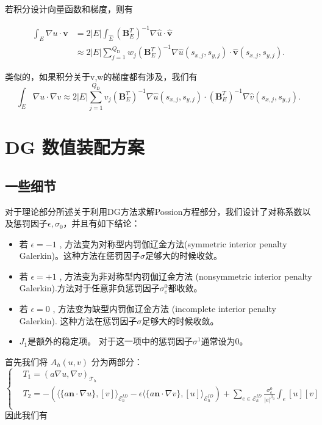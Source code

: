 若积分设计向量函数和梯度，则有

$$\begin{aligned}
\int_{E} \nabla u \cdot \boldsymbol{v} & =2|E| \int_{\hat{E}}\left(\boldsymbol{B}_{E}^{T}\right)^{-1} \nabla \hat{u} \cdot \hat{\boldsymbol{v}} \\
& \approx 2|E| \sum_{j=1}^{Q_{\mathrm{D}}} w_{j}\left(\boldsymbol{B}_{E}^{T}\right)^{-1} \nabla \hat{u}\left(s_{x, j}, s_{y, j}\right) \cdot \hat{\boldsymbol{v}}\left(s_{x, j}, s_{y, j}\right) .
\end{aligned}$$

类似的，如果积分关于v,w的梯度都有涉及，我们有
$$\int_{E} \nabla u \cdot \nabla v \approx 2|E| \sum_{j=1}^{Q_{\mathrm{D}}} v_{j}\left(\boldsymbol{B}_{E}^{T}\right)^{-1} \nabla \hat{u}\left(s_{x, j}, s_{y, j}\right) \cdot\left(\boldsymbol{B}_{E}^{T}\right)^{-1} \nabla \hat{v}\left(s_{x, j}, s_{y, j}\right) .$$

\section{DG 数值装配方案}
\subsection{一些细节}
对于理论部分所述关于利用DG方法求解Possion方程部分，我们设计了对称系数以及惩罚因子$\epsilon, \sigma_0$，并且有如下结论：
\begin{itemize}
    \item 若  $\epsilon=-1$ , 方法变为对称型内罚伽辽金方法(symmetric interior penalty Galerkin)。这种方法在惩罚因子$\sigma$足够大的时候收敛。
    \item 若  $\epsilon=+1$ , 方法变为非对称型内罚伽辽金方法 (nonsymmetric interior penalty Galerkin).方法对于任意非负惩罚因子$\sigma_{e}^{0}$都收敛。
    \item 若  $\epsilon=0$ , 方法变为缺型内罚伽辽金方法  (incomplete interior penalty Galerkin). 这种方法在惩罚因子$\sigma$足够大的时候收敛。
    \item $J_{1}$是额外的稳定项。 对于这一项中的惩罚因子$\sigma^1$通常设为0。
\end{itemize}

首先我们将 $A_h(u,v)$ 分为两部分： 
$$\left\{\begin{aligned}
    &T_1 =  (a \nabla u, \nabla v)_{\mathscr{T}_{h}}\\
    &T_2 = -\left(\langle\{a\textbf{n}\cdot \nabla u \},[v]\rangle_{\mathcal{E}_{h}^{I D}}-\epsilon\langle\{a \textbf{n}\cdot\nabla v \}, [u]\rangle_{\mathcal{E}_{h}^{I D}}\right)+\sum_{e \in \mathcal{E}_{h}^{I D}}\frac{\sigma_{e}^{0}}{|e|^{\beta_{0}}} \int_{e}\left[u\right][v]\\
\end{aligned}\right.$$
因此我们有

